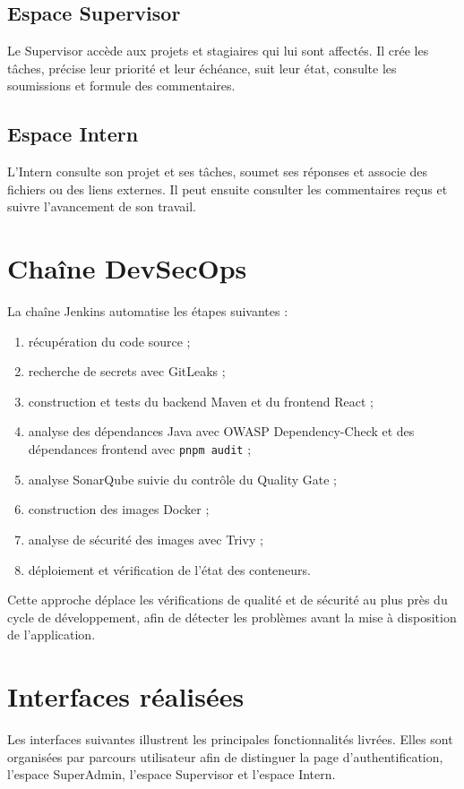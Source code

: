 \subsection{Espace Supervisor}
Le Supervisor accède aux projets et stagiaires qui lui sont affectés. Il crée les tâches, précise leur priorité et leur échéance, suit leur état, consulte les soumissions et formule des commentaires.

\subsection{Espace Intern}
L'Intern consulte son projet et ses tâches, soumet ses réponses et associe des fichiers ou des liens externes. Il peut ensuite consulter les commentaires reçus et suivre l'avancement de son travail.

\section{Chaîne DevSecOps}
La chaîne Jenkins automatise les étapes suivantes :
\begin{enumerate}
  \item récupération du code source ;
  \item recherche de secrets avec GitLeaks ;
  \item construction et tests du backend Maven et du frontend React ;
  \item analyse des dépendances Java avec OWASP Dependency-Check et des dépendances frontend avec \texttt{pnpm audit} ;
  \item analyse SonarQube suivie du contrôle du Quality Gate ;
  \item construction des images Docker ;
  \item analyse de sécurité des images avec Trivy ;
  \item déploiement et vérification de l'état des conteneurs.
\end{enumerate}
Cette approche déplace les vérifications de qualité et de sécurité au plus près du cycle de développement, afin de détecter les problèmes avant la mise à disposition de l'application.

\section{Interfaces réalisées}
Les interfaces suivantes illustrent les principales fonctionnalités livrées. Elles sont organisées par parcours utilisateur afin de distinguer la page d'authentification, l'espace SuperAdmin, l'espace Supervisor et l'espace Intern.


